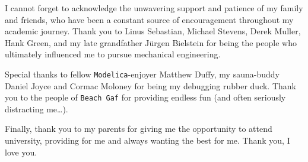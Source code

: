 I cannot forget to acknowledge the unwavering support and patience of my family and friends, who have been a constant source of encouragement throughout my academic journey. Thank you to Linus Sebastian, Michael Stevens, Derek Muller, Hank Green, and my late grandfather J\"urgen Bielstein for being the people who ultimately influenced me to pursue mechanical engineering. 


Special thanks to fellow \texttt{Modelica}-enjoyer Matthew Duffy, my sauna-buddy Daniel Joyce and Cormac Moloney for being my debugging rubber duck. Thank you to the people of \texttt{Beach Gaf} for providing endless fun (and often seriously distracting me\ldots).

Finally, thank you to my parents for giving me the opportunity to attend university, providing for me and always wanting the best for me. Thank you, I love you.








\endgroup
